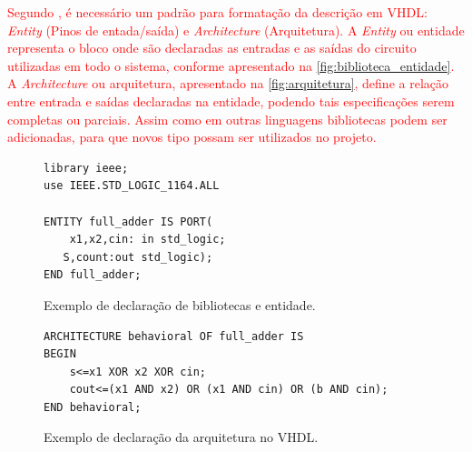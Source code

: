 \par
\textcolor{red}{Segundo \cite{IEEEVHDLLanguage}, é necessário um padrão para formatação da descrição em VHDL: \textit{Entity} (Pinos de entada/saída) e \textit{Architecture} (Arquitetura). A \textit{Entity} ou entidade representa o bloco onde são declaradas as entradas e as saídas do circuito utilizadas em todo o sistema, conforme apresentado na \autoref{fig:biblioteca_entidade}. A \textit{Architecture} ou arquitetura, apresentado na \autoref{fig:arquitetura}, define a relação entre entrada e saídas declaradas na entidade, podendo tais especificações serem completas ou parciais. Assim como em outras linguagens bibliotecas podem ser adicionadas, para que novos tipo possam ser utilizados no projeto.} 

\begin{figure}[thp]
\caption{\label{fig:biblioteca_entidade} Exemplo de declaração de bibliotecas e entidade.}
	\begin{center}
    \begin{minipage}{0.6\textwidth}
    \begin{lstlisting}       
library ieee;
use IEEE.STD_LOGIC_1164.ALL

ENTITY full_adder IS PORT(
	x1,x2,cin: in std_logic;
   S,count:out std_logic);
END full_adder;
\end{lstlisting}
    \end{minipage}
	\end{center}
\end{figure}

\begin{figure}[thp]
\caption{\label{fig:arquitetura} Exemplo de declaração da arquitetura no VHDL.}
	\begin{center}
    \begin{minipage}{0.6\textwidth}
    \begin{lstlisting}       
ARCHITECTURE behavioral OF full_adder IS
BEGIN
	s<=x1 XOR x2 XOR cin;
    cout<=(x1 AND x2) OR (x1 AND cin) OR (b AND cin);
END behavioral;

\end{lstlisting}
    \end{minipage}
	\end{center}
\end{figure}

